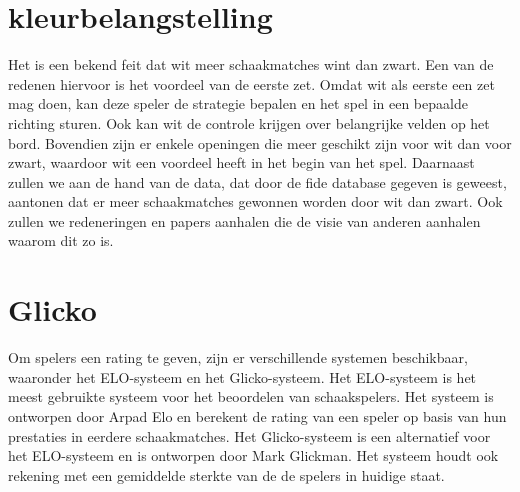 \section{kleurbelangstelling}

Het is een bekend feit dat wit meer schaakmatches wint dan zwart. Een van de redenen hiervoor is het voordeel van de eerste zet. Omdat wit als eerste een zet mag doen, kan deze speler de strategie bepalen en het spel in een bepaalde richting sturen. Ook kan wit de controle krijgen over belangrijke velden op het bord. Bovendien zijn er enkele openingen die meer geschikt zijn voor wit dan voor zwart, waardoor wit een voordeel heeft in het begin van het spel. Daarnaast zullen we aan de hand van de data, dat door de fide database gegeven is geweest, aantonen dat er meer schaakmatches gewonnen worden door wit dan zwart. Ook zullen we redeneringen en papers aanhalen die de visie van anderen aanhalen waarom dit zo is.

\section{Glicko}

Om spelers een rating te geven, zijn er verschillende systemen beschikbaar, waaronder het ELO-systeem en het Glicko-systeem. Het ELO-systeem is het meest gebruikte systeem voor het beoordelen van schaakspelers. Het systeem is ontworpen door Arpad Elo en berekent de rating van een speler op basis van hun prestaties in eerdere schaakmatches. Het Glicko-systeem is een alternatief voor het ELO-systeem en is ontworpen door Mark Glickman. Het systeem houdt ook rekening met een gemiddelde sterkte van de de spelers in huidige staat.




